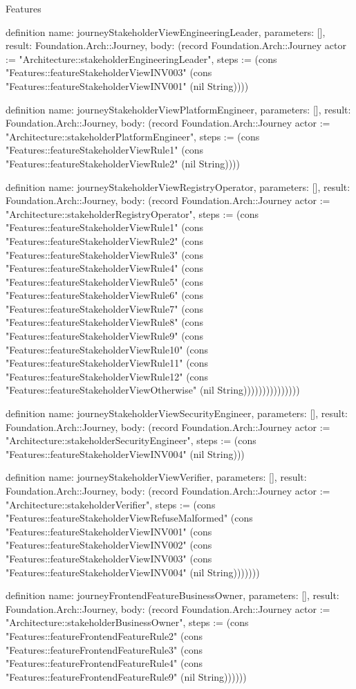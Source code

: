 \begin{lexlean}{Features}
\begin{semanticmodule}
definition{
  name: journeyStakeholderViewEngineeringLeader,
  parameters: [],
  result: Foundation.Arch::Journey,
  body: (record Foundation.Arch::Journey {actor := "Architecture::stakeholderEngineeringLeader", steps := (cons "Features::featureStakeholderViewINV003" (cons "Features::featureStakeholderViewINV001" (nil String)))})
}

definition{
  name: journeyStakeholderViewPlatformEngineer,
  parameters: [],
  result: Foundation.Arch::Journey,
  body: (record Foundation.Arch::Journey {actor := "Architecture::stakeholderPlatformEngineer", steps := (cons "Features::featureStakeholderViewRule1" (cons "Features::featureStakeholderViewRule2" (nil String)))})
}

definition{
  name: journeyStakeholderViewRegistryOperator,
  parameters: [],
  result: Foundation.Arch::Journey,
  body: (record Foundation.Arch::Journey {actor := "Architecture::stakeholderRegistryOperator", steps := (cons "Features::featureStakeholderViewRule1" (cons "Features::featureStakeholderViewRule2" (cons "Features::featureStakeholderViewRule3" (cons "Features::featureStakeholderViewRule4" (cons "Features::featureStakeholderViewRule5" (cons "Features::featureStakeholderViewRule6" (cons "Features::featureStakeholderViewRule7" (cons "Features::featureStakeholderViewRule8" (cons "Features::featureStakeholderViewRule9" (cons "Features::featureStakeholderViewRule10" (cons "Features::featureStakeholderViewRule11" (cons "Features::featureStakeholderViewRule12" (cons "Features::featureStakeholderViewOtherwise" (nil String))))))))))))))})
}

definition{
  name: journeyStakeholderViewSecurityEngineer,
  parameters: [],
  result: Foundation.Arch::Journey,
  body: (record Foundation.Arch::Journey {actor := "Architecture::stakeholderSecurityEngineer", steps := (cons "Features::featureStakeholderViewINV004" (nil String))})
}

definition{
  name: journeyStakeholderViewVerifier,
  parameters: [],
  result: Foundation.Arch::Journey,
  body: (record Foundation.Arch::Journey {actor := "Architecture::stakeholderVerifier", steps := (cons "Features::featureStakeholderViewRefuseMalformed" (cons "Features::featureStakeholderViewINV001" (cons "Features::featureStakeholderViewINV002" (cons "Features::featureStakeholderViewINV003" (cons "Features::featureStakeholderViewINV004" (nil String))))))})
}

definition{
  name: journeyFrontendFeatureBusinessOwner,
  parameters: [],
  result: Foundation.Arch::Journey,
  body: (record Foundation.Arch::Journey {actor := "Architecture::stakeholderBusinessOwner", steps := (cons "Features::featureFrontendFeatureRule2" (cons "Features::featureFrontendFeatureRule3" (cons "Features::featureFrontendFeatureRule4" (cons "Features::featureFrontendFeatureRule9" (nil String)))))})
}


\end{semanticmodule}
\end{lexlean}

